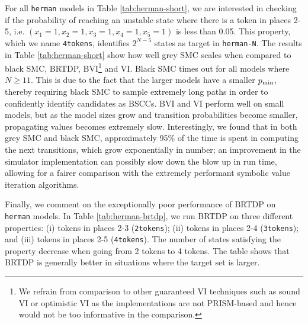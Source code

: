 For all \texttt{herman} models in Table \ref{tab:herman-short}, we are interested in checking if the probability of reaching an unstable state where there is a token in places 2-5, i.e. $(x_1=1, x_2=1, x_3=1, x_4=1, x_5=1)$ is less than 0.05.
This property, which we name \texttt{4tokens}, identifies $2^{N-5}$ states as target in \texttt{herman-N}.
The results in Table \ref{tab:herman-short} show how well grey SMC scales when compared to black SMC, BRTDP, BVI\footnote{We refrain from comparison to other guaranteed VI techniques such as sound VI \cite{DBLP:conf/cav/QuatmannK18} or optimistic VI \cite{DBLP:journals/corr/abs-1910-01100} as the implementations are not PRISM-based and hence would not be too informative in the comparison.} and VI.
Black SMC times out for all models where $N \geq 11$. This is due to the fact that the larger models have a smaller $p_{\min}$, thereby requiring black SMC to sample extremely long paths in order to confidently identify candidates as BSCCs.
BVI and VI perform well on small models, but as the model sizes grow and transition probabilities become smaller, propagating values becomes extremely slow.
Interestingly, we found that in both grey SMC and black SMC, approximately 95\% of the time is spent in computing the next transitions, which grow exponentially in number; an improvement in the simulator implementation can possibly slow down the blow up in run time, allowing for a fairer comparison with the extremely performant symbolic value iteration algorithms.



Finally, we comment on the exceptionally poor performance of BRTDP on \texttt{herman} models. 
In Table \ref{tab:herman-brtdp}, we run BRTDP on three different properties: (i) tokens in places 2-3 (\texttt{2tokens}); (ii) tokens in places 2-4 (\texttt{3tokens}); and (iii) tokens in places 2-5 (\texttt{4tokens}). 
The number of states satisfying the property decrease when going from 2 tokens to 4 tokens.
The table shows that BRTDP is generally better in situations where the target set is larger. %

